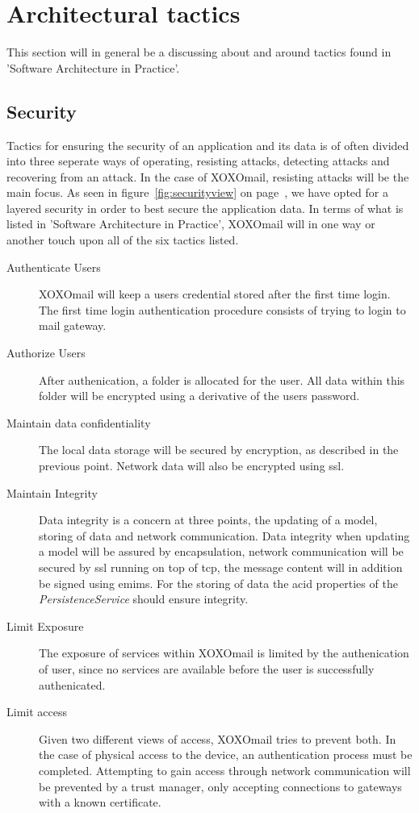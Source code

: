 \section{Architectural tactics}
	This section will in general be a discussing about and around tactics found in 'Software Architecture in Practice'\cite{bib:archi}. 
	\subsection{Security}
		Tactics for ensuring the security of an application and its data is of often divided into three seperate ways of operating, resisting attacks, detecting attacks and recovering from an attack. 
		In the case of XOXOmail, resisting attacks will be the main focus. As seen in figure~\ref{fig:securityview} on page~\pageref{fig:securityview}, we have opted for a layered security in order to best secure the application data. In terms of what is listed in 'Software Architecture in Practice'\cite[p. 119]{bib:archi}, XOXOmail will in one way or another touch upon all of the six tactics listed. 
		\begin{description}
			\item[Authenticate Users] XOXOmail will keep a users credential stored after the first time login. The first time login authentication procedure consists of trying to login to mail gateway.
			\item[Authorize Users] After authenication, a folder is allocated for the user. All data within this folder will be encrypted using a derivative of the users password. 
			\item[Maintain data confidentiality] The local data storage will be secured by encryption, as described in the previous point. Network data will also be encrypted using \gls{ssl}. 
			\item[Maintain Integrity] Data integrity is a concern at three points, the updating of a model, storing of data and network communication. Data integrity when updating a model will be assured by encapsulation, network communication will be secured by \gls{ssl} running on top of \gls{tcp}, the message content will in addition be signed using \gls{emims}. For the storing of data the \gls{acid} properties of the \textit{PersistenceService} should ensure integrity. 
			\item[Limit Exposure] The exposure of services within XOXOmail is limited by the authenication of user, since no services are available before the user is successfully authenicated.
			\item[Limit access] Given two different views of access, XOXOmail tries to prevent both. In the case of physical access to the device, an authentication process must be completed. Attempting to gain access through network communication will be prevented by a trust manager, only accepting connections to gateways with a known certificate. 
		\end{description}
		
